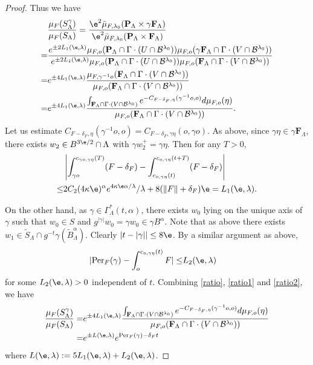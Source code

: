 \documentclass[11pt]{amsart}
\theoremstyle{definition}
\newcommand{\BBB}{\mathcal{B}}
\def\a{\alpha}
\def\c{\gamma}   \def\C{\Gamma}
\def\d{\delta}   %
\def\l{\lambda}   \def\L{\Lambda}
\def\bP{\textbf{P}}
\def\bF{\textbf{F}}
\newcommand{\Per}{\mathrm{Per}}
\begin{document}
\begin{proof}
Thus we have
\begin{equation}\label{ratio}
\begin{aligned}
&\frac{\mu_F(S_\L^\c)}{\mu_F(S_\L)}=\frac{\e^2\bar \mu_{F,\l_0}(\bP_\L \times \c\bF_\L)}{\e^2\bar \mu_{F,\l_0}(\bP_\L \times \bF_\L)}\\
=&\frac{e^{\pm 2L_1(\e,\l)}\mu_{F,o}(\bP_\L\cap \C\cdot(U\cap \BBB^{\l_0}))\mu_{F,o}(\c\bF_\L\cap \C\cdot(V\cap \BBB^{\l_0}))}{e^{\pm 2L_1(\e,\l)}\mu_{F,o}(\bP_\L\cap \C\cdot(U\cap \BBB^{\l_0}))\mu_{F,o}(\bF_\L\cap \C\cdot(V\cap \BBB^{\l_0}))}\\
=&e^{\pm 4L_1(\e,\l)}\frac{\mu_{F,\c^{-1}o}(\bF_\L\cap \C\cdot(V\cap \BBB^{\l_0}))}{\mu_{F,o}(\bF_\L\cap \C\cdot(V\cap \BBB^{\l_0}))}\\
=&e^{\pm 4L_1(\e,\l)}\frac{\int_{\bF_\L\cap \C\cdot(V\cap \BBB^{\l_0})}e^{-C_{F-\d_F,\eta}(\c^{-1}o,o)}d\mu_{F,o}(\eta)}{\mu_{F,o}(\bF_\L\cap \C\cdot(V\cap \BBB^{\l_0}))}.
\end{aligned}
\end{equation}
Let us estimate $C_{F-\d_F,\eta}(\c^{-1}o,o)=C_{F-\d_F,\c\eta}(o,\c o)$. As above, since $\c\eta\in\c \bF_\L$, there exists $w_2\in B^{3\e/2}\cap \L$ with $\c w_2^+=\c\eta$. Then for any $T>0$,
\begin{equation}\label{ratio1}
\begin{aligned}
&\left|\int_{\c o}^{c_{\c o, \c\eta}(T)}(F-\d_F)-\int_{c_{o,\c\eta}(t)}^{c_{o,\c\eta}(t+T)}(F-\d_F)\right|\\
\le&2C_2(4\kappa\e)^\a e^{4\kappa\e\a/\l}/\l+8(\|F\|+\d_F)\e=L_1(\e,\l).
\end{aligned}
\end{equation}

On the other hand, as $\c\in \C^*_{\L}(t,\a)$, there exists $w_0$ lying on the unique axis of $\c$ such that $w_0\in S$ and $g^{|\c|}w_0=\c w_0\in \c B^\a$. Note that as above there exists $w_1\in \tilde S_\L\cap g^{-t}\c(\tilde B^\a_\L)$. Clearly $|t-|\c||\le 8\e$. 
By a similar argument as above,
\begin{equation}\label{ratio2}
\begin{aligned}
|\Per_F(\c)-\int_{o}^{c_{o,\c\eta}(t)}F|\le &L_2(\e,\l)
\end{aligned}
\end{equation}
for some $L_2(\e,\l)>0$ independent of $t$. Combining \eqref{ratio}, \eqref{ratio1} and \eqref{ratio2}, we have 
\begin{equation*}
\begin{aligned}
\frac{\mu_F(S_\L^\c)}{\mu_F(S_\L)}=&e^{\pm 4L_1(\e,\l)}\frac{\int_{\bF_\L\cap \C\cdot(V\cap \BBB^{\l_0})}e^{-C_{F-\d_F,\eta}(\c^{-1}o,o)}d\mu_{F,o}(\eta)}{\mu_{F,o}(\bF_\L\cap \C\cdot(V\cap \BBB^{\l_0}))}\\
=&e^{\pm L(\e,\l)}e^{\Per_F(\c)-\d_Ft}
\end{aligned}
\end{equation*}
where $L(\e,\l):=5L_1(\e,\l)+L_2(\e,\l)$.
\end{proof}
\end{document}
